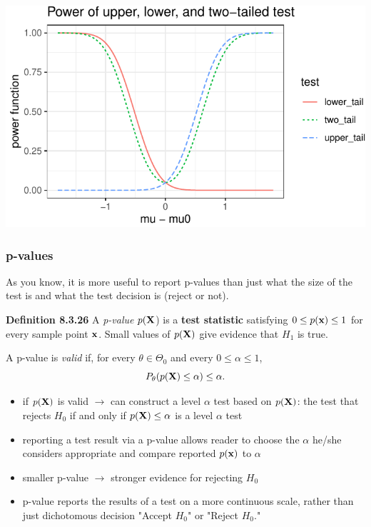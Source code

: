 \documentclass[11pt,]{article}
\def\bx{{\bf x}}
\def\bX{{\bf X}}
\begin{document}
\begin{center}\includegraphics[width=1\linewidth]{class_notes_files/figure-latex/plot_normal_power_curve_ump-1} \end{center}

\hypertarget{p-values}{%
\subsubsection{p-values}\label{p-values}}

As you know, it is more useful to report p-values than just what the
size of the test is and what the test decision is (reject or not).

\noindent\textbf{Definition 8.3.26} A \emph{p-value} \(p(\bX\)) is a
\textbf{test statistic} satisfying \(0\leq p(\bx)\leq1\) for every
sample point \(\bx\). Small values of \(p(\bX)\) give evidence that
\(H_1\) is true.

A p-value is \emph{valid} if, for every \(\theta \in \Theta_0\) and
every \(0\leq \alpha \leq 1\),
\[P_\theta (p(\bX) \leq \alpha) \leq \alpha.\]

\begin{itemize}
\item if $p(\bX)$ is valid $\rightarrow$ can construct a level $\alpha$ test based on $p(\bX)$: the test that rejects $H_0$ if and only if $p(\bX) \leq \alpha$ is a level $\alpha$ test
\item reporting a test result via a p-value allows reader to choose the $\alpha$ he/she considers appropriate and compare reported $p(\bx)$ to $\alpha$
\item smaller p-value $\rightarrow$ stronger evidence for rejecting $H_0$
\item p-value reports the results of a test on a more continuous scale, rather than just dichotomous decision "Accept $H_0$" or "Reject $H_0$."
\end{itemize}
\end{document}
